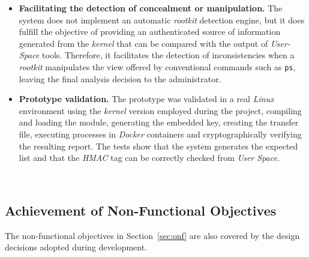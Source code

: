 \begin{itemize}
    \item \textbf{Facilitating the detection of concealment or manipulation.} The system does not implement an automatic \textit{rootkit} detection engine, but it does fulfill the objective of providing an authenticated source of information generated from the \textit{kernel} that can be compared with the output of \textit{User-Space} tools. Therefore, it facilitates the detection of inconsistencies when a \textit{rootkit} manipulates the view offered by conventional commands such as \texttt{ps}, leaving the final analysis decision to the administrator.
    
    \item \textbf{Prototype validation.} The prototype was validated in a real \textit{Linux} environment using the \textit{kernel} version employed during the project, compiling and loading the module, generating the embedded key, creating the transfer file, executing processes in \textit{Docker} containers and cryptographically verifying the resulting report. The tests show that the system generates the expected list and that the \textit{HMAC} tag can be correctly checked from \textit{User Space}.
\end{itemize}

\

\subsection{Achievement of Non-Functional Objectives}

The non-functional objectives in Section~\ref{sec:onf} are also covered by the design decisions adopted during development.\\

